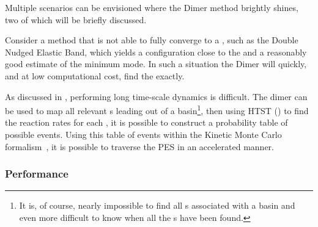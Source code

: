 Multiple scenarios can be envisioned where the Dimer method brightly shines, two of which will be briefly discussed.

\item Consider a method that is not able to fully converge to a , such as the Double Nudged Elastic Band, which yields a configuration close to the  and a reasonably good estimate of the minimum mode.
In such a situation the Dimer will quickly, and at low computational cost, find the  exactly.
~\cite{dneb-2004}
\item As discussed in , performing long time-scale dynamics is difficult.
The dimer can be used to map all relevant s leading out of a basin\footnote{It is, of course, nearly impossible to find all s associated with a basin and even more difficult to know when all the s have been found. \expand}, then using HTST () to find the reaction rates for each , it is possible to construct a probability table of possible events.
Using this table of events within the Kinetic Monte Carlo formalism~\citemiss, it is possible to traverse the PES in an accelerated manner.
~\cite{akmc-2001}
\een

\subsubsection{Performance}
\placeholder



